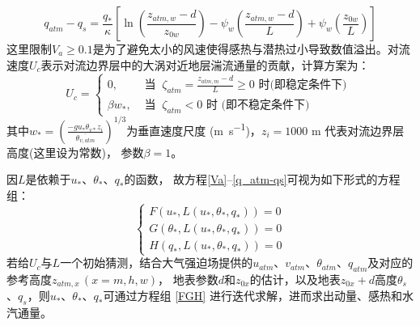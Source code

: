 %
\begin{equation}\label{q_atm-qs}
q_{atm}-q_{s}=\frac{q_{*}}{\kappa}\left[\ln \left(\frac{z_{atm, w}-d}{z_{0 w}}\right)-\psi_{w}\left(\frac{z_{atm, w}-d}{L}\right)+\psi_{w}\left(\frac{z_{0 w}}{L}\right)\right]
\end{equation}
这里限制$V_a\geqslant0.1$是为了避免太小的风速使得感热与潜热过小导致数值溢出。对流速度$U_c$表示对流边界层中的大涡对近地层湍流通量的贡献，计算方案为：
\begin{equation}
U_{c}= \begin{cases}
 0, & \text { 当 }\ \zeta_{atm}=\frac{z_{atm, m}-d}{L} \geqslant 0 \text { 时(即稳定条件下) } \\
\beta w_{*}, & \text { 当 }\ \zeta_{atm}<0 \text { 时 (即不稳定条件下) }
\end{cases}
\end{equation}
其中$w_\ast={(\frac{-gu_\ast\theta_{v\ast}z_i}{\overline{\theta_{v,atm}}})}^{1/3}$为垂直速度尺度 (\unit{m.s^{-1}})，$z_i=1000$ m 代表对流边界层高度(这里设为常数)，
参数$\beta=1$。

因$L$是依赖于$u_\ast$、$\theta_\ast$、$q_\ast$的函数，
故方程\eqref{Va}--\eqref{q_atm-qs}可视为如下形式的方程组：
\begin{equation}\label{FGH}
\left\{\begin{array}{l}F\left(u_{*}, L\left(u_{*}, \theta_{*}, q_{*}\right)\right)=0 \\
      G\left(\theta_{*}, L\left(u_{*}, \theta_{*}, q_{*}\right)\right)=0 \\ 
      H\left(q_{*}, L\left(u_{*}, \theta_{*}, q_{*}\right)\right)=0\end{array}\right.
\end{equation}
若给$U_c$与$L$一个初始猜测，结合大气强迫场提供的$u_{atm}$、$v_{atm}$、$\theta_{atm}$、$q_{atm}$及对应的参考高度$z_{atm,x}\, (x=m,h,w)$，
地表参数$d$和$z_{0x}$的估计，以及地表$z_{0x}+d$高度$\theta_s$、$q_s$，则$u_\ast$、$\theta_\ast$、$q_\ast$可通过方程组
\eqref{FGH}
进行迭代求解，进而求出动量、感热和水汽通量。


